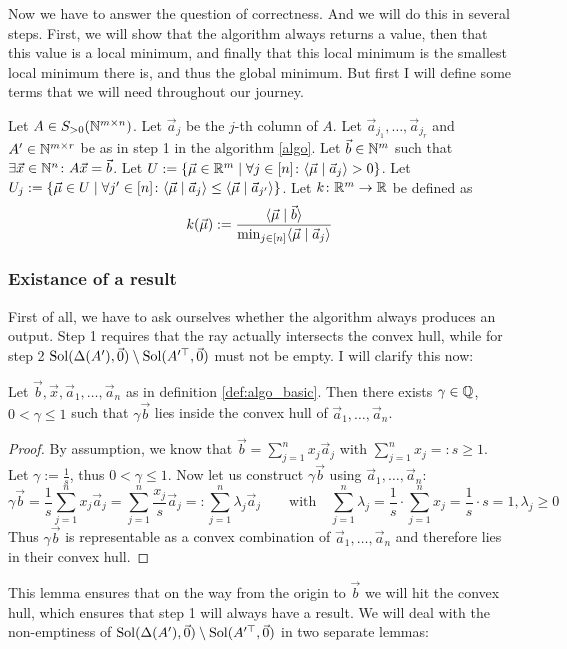 Now we have to answer the question of correctness. And we will do this in several steps. First, we will show that the algorithm always returns a value, then that this value is a local minimum, and finally that this local minimum is the smallest local minimum there is, and thus the global minimum. But first I will define some terms that we will need throughout our journey.
\begin{definition}
    \label{def:algo_basic}
    Let $A \in S_{>0}(\mathbb{N}^{m \times n})$. Let $\vec a_j$ be the $j$-th column of $A$. Let $\vec a_{j_1}, \dots, \vec a_{j_r}$ and $A' \in \mathbb{N}^{m\times r}$ be as in step 1 in the algorithm \ref{algo}. Let $\vec b \in \mathbb{N}^m$ such that $\exists \vec x \in \mathbb{N}^n\colon A\vec x = \vec b$. Let $U := \{\vec\mu \in \mathbb{R}^m\mid \forall j \in [n]\colon\langle \vec\mu \mid \vec a_j \rangle > 0\}$. Let $U_j := \{\vec\mu \in U \mid \forall j'\in[n]\colon \langle \vec\mu \mid \vec a_j \rangle \leq \langle \vec\mu \mid \vec a_{j'} \rangle\}$. Let $k\colon \mathbb{R}^m\to\mathbb{R}$ be defined as 
    $$k(\vec\mu) := \frac{\langle \vec\mu \mid \vec b \rangle}{\min_{j\in[n]}\langle \vec\mu \mid \vec a_j \rangle}$$
\end{definition}

\subsubsection{Existance of a result}
First of all, we have to ask ourselves whether the algorithm always produces an output. Step 1 requires that the ray actually intersects the convex hull, while for step 2 $\operatorname{Sol}(\Delta(A'), \vec0) \setminus \operatorname{Sol}(A'^\top, \vec0)$ must not be empty. I will clarify this now:

\begin{lemma}
    \label{lemma:b_behind_hull}
    Let $\vec b, \vec x, \vec a_1, \dots, \vec a_n$ as in definition \ref{def:algo_basic}. Then there exists $\gamma \in \mathbb{Q}$, $0 < \gamma \leq 1$ such that $\gamma \vec b$ lies inside the convex hull of $\vec a_1, \dots, \vec a_n$.
\end{lemma}
\begin{proof}
    By assumption, we know that $\vec b = \sum_{j=1}^{n}x_j \vec a_j$ with $\sum_{j=1}^{n}x_j =: s \geq 1$. Let $\gamma := \frac{1}{s}$, thus $0 < \gamma \leq 1$. Now let us construct $\gamma\vec b$ using $\vec a_1, \dots, \vec a_n$:
    $$\gamma\vec b = \frac{1}{s}\sum_{j=1}^{n}x_j \vec a_j = \sum_{j=1}^{n}\frac{x_j}{s}\vec a_j =: \sum_{j=1}^{n} \lambda_j\vec a_j \qquad \mathrm{with}\quad \sum_{j=1}^{n}\lambda_j = \frac{1}{s}\cdot \sum_{j=1}^{n} x_j = \frac{1}{s}\cdot s = 1, \lambda_j \geq 0$$
    Thus $\gamma\vec b$ is representable as a convex combination of $\vec a_1, \dots, \vec a_n$ and therefore lies in their convex hull.
\end{proof}
This lemma ensures that on the way from the origin to $\vec b$ we will hit the convex hull, which ensures that step 1 will always have a result. We will deal with the non-emptiness of $\operatorname{Sol}(\Delta(A'), \vec0)\setminus \operatorname{Sol}(A'^\top, \vec0)$ in two separate lemmas:

